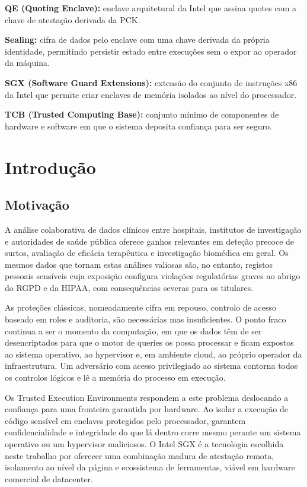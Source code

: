 \noindent\textbf{QE (Quoting Enclave):} enclave arquitetural da Intel que assina quotes com a chave de atestação derivada da PCK.

\noindent\textbf{Sealing:} cifra de dados pelo enclave com uma chave derivada da própria identidade, permitindo persistir estado entre execuções sem o expor ao operador da máquina.

\noindent\textbf{SGX (Software Guard Extensions):} extensão do conjunto de instruções x86 da Intel que permite criar enclaves de memória isolados ao nível do processador.

\noindent\textbf{TCB (Trusted Computing Base):} conjunto mínimo de componentes de hardware e software em que o sistema deposita confiança para ser seguro.

\section{Introdução}

\subsection{Motivação}

A análise colaborativa de dados clínicos entre hospitais, institutos de investigação e autoridades de saúde pública oferece ganhos relevantes em deteção precoce de surtos, avaliação de eficácia terapêutica e investigação biomédica em geral. Os mesmos dados que tornam estas análises valiosas são, no entanto, registos pessoais sensíveis cuja exposição configura violações regulatórias graves ao abrigo do RGPD e da HIPAA, com consequências severas para os titulares.

As proteções clássicas, nomeadamente cifra em repouso, controlo de acesso baseado em roles e auditoria, são necessárias mas insuficientes. O ponto fraco continua a ser o momento da computação, em que os dados têm de ser desencriptados para que o motor de queries os possa processar e ficam expostos ao sistema operativo, ao hypervisor e, em ambiente cloud, ao próprio operador da infraestrutura. Um adversário com acesso privilegiado ao sistema contorna todos os controlos lógicos e lê a memória do processo em execução.

Os Trusted Execution Environments respondem a este problema deslocando a confiança para uma fronteira garantida por hardware. Ao isolar a execução de código sensível em enclaves protegidos pelo processador, garantem confidencialidade e integridade do que lá dentro corre mesmo perante um sistema operativo ou um hypervisor maliciosos. O Intel SGX é a tecnologia escolhida neste trabalho por oferecer uma combinação madura de atestação remota, isolamento ao nível da página e ecossistema de ferramentas, viável em hardware comercial de datacenter.

